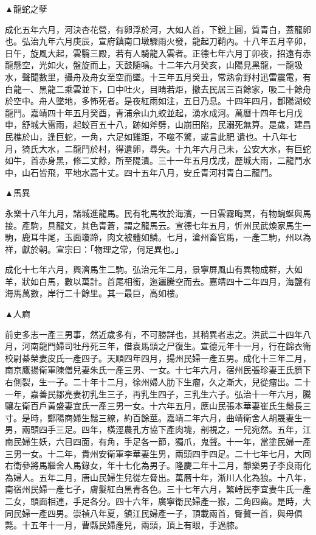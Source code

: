 \begin{pinyinscope}
▲龍蛇之孽

成化五年六月，河決杏花營，有卵浮於河，大如人首，下銳上圓，質青白，蓋龍卵也。弘治九年六月庚辰，宣府鎮南口墩驟雨火發，龍起刀鞘內。十八年五月辛卯，日午，旋風大起，雲翳三殿，若有人騎龍入雲者。正德七年六月丁卯夜，招遠有赤龍懸空，光如火，盤旋而上，天鼓隨鳴。十二年六月癸亥，山陽見黑龍，一龍吸水，聲聞數里，攝舟及舟女至空而墜。十三年五月癸丑，常熟俞野村迅雷震電，有白龍一、黑龍二乘雲並下，口中吐火，目睛若炬，撤去民居三百餘家，吸二十餘舟於空中。舟人墜地，多怖死者。是夜紅雨如注，五日乃息。十四年四月，鄱陽湖蛟龍鬥。嘉靖四十年五月癸酉，青浦佘山九蛟並起，湧水成河。萬曆十四年七月戊申，舒城大雷雨，起蛟百五十八，跡如斧劈，山崩田陷，民溺死無算。是歲，建昌民樵於山，逢巨蛇，一角，六足如雞距，不噬不驚，或言此肥遺也。十八年七月，猗氏大水，二龍鬥於村，得遺卵，尋失。十九年六月己未，公安大水，有巨蛇如牛，首赤身黑，修二丈餘，所至隄潰。三十一年五月戊戌，歷城大雨，二龍鬥水中，山石皆飛，平地水高十丈。四十五年八月，安丘青河村青白二龍鬥。

▲馬異

永樂十八年九月，諸城進龍馬。民有牝馬牧於海濱，一日雲霧晦冥，有物蜿蜒與馬接。產駒，具龍文，其色青蒼，謂之龍馬云。宣德七年五月，忻州民武煥家馬生一駒，鹿耳牛尾，玉面瓊蹄，肉文被體如鱗。七月，滄州畜官馬，一產二駒，州以為祥，獻於朝。宣宗曰：「物理之常，何足異也。」

成化十七年六月，興濟馬生二駒。弘治元年二月，景寧屏風山有異物成群，大如羊，狀如白馬，數以萬計。首尾相銜，迤邐騰空而去。嘉靖四十二年四月，海鹽有海馬萬數，岸行二十餘里。其一最巨，高如樓。

▲人痾

前史多志一產三男事，然近歲多有，不可勝詳也，其稍異者志之。洪武二十四年八月，河南龍門婦司牡丹死三年，借袁馬頭之尸復生。宣德元年十一月，行在錦衣衛校尉綦榮妻皮氏一產四子。天順四年四月，揚州民婦一產五男。成化十三年二月，南京鷹揚衛軍陳僧兒妻朱氏一產三男、一女。十七年六月，宿州民張珍妻王氏臍下右側裂，生一子。二十年十二月，徐州婦人肋下生瘤，久之漸大，兒從瘤出。二十一年，嘉善民鄒亮妻初乳生三子，再乳生四子，三乳生六子。弘治十一年六月，騰驤左衛百戶黃盛妻宜氏一產三男一女。十六年五月，應山民張本華妻崔氏生鬚長三寸。是時，鄭陽商婦生鬚三繚，約百餘莖。嘉靖二年六月，曲靖衛舍人胡晟妻生一男，兩頭四手三足。四年，橫涇農孔方協下產肉塊，剖視之，一兒宛然。五年，江南民婦生妖，六目四面，有角，手足各一節，獨爪，鬼聲。十一年，當塗民婦一產三男一女。十二年，貴州安衛軍李華妻生男，兩頭四手四足。二十七年七月，大同右衛參將馬繼舍人馬錄女，年十七化為男子。隆慶二年十二月，靜樂男子李良雨化為婦人。五年二月，唐山民婦生兒從左脅出。萬曆十年，淅川人化為狼。十八年，南宿州民婦一產七子，膚髮紅白黑青各色。三十七年六月，繁峙民李宜妻牛氏一產二女，頭面相連，手足各分。四十六年，廣寧衛民婦產一猴，二角四齒。是時，大同民婦一產四男。崇禎八年夏，鎮江民婦產一子，頂載兩首，臀贅一首，與母俱斃。十五年十一月，曹縣民婦產兒，兩頭，頂上有眼，手過膝。


\end{pinyinscope}
